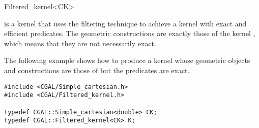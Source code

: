 
\begin{ccRefClass}{Filtered_kernel<CK>}


\KernelRefLayout\gdef\ccTagOperatorLayout{\ccFalse}

\ccDefinition

\ccClassTemplateName is a kernel that uses the filtering technique
\cite{cgal:bbp-iayed-01} to achieve a kernel with exact and efficient
predicates.
The geometric constructions are exactly those
of the kernel , which means that they are not necessarily exact.







\ccExample

The following example shows how to produce a kernel whose geometric
objects and constructions are those of 
but the predicates are exact. 

\begin{verbatim}
#include <CGAL/Simple_cartesian.h>
#include <CGAL/Filtered_kernel.h>

typedef CGAL::Simple_cartesian<double> CK;
typedef CGAL::Filtered_kernel<CK> K;

\end{verbatim}


\end{ccRefClass}
